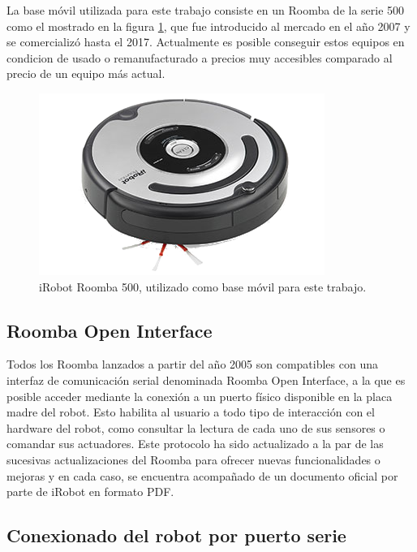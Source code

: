 La base móvil utilizada para este trabajo consiste en un Roomba de la serie 500 como el mostrado en la figura \ref{fig:roomba}, que fue introducido al mercado en el año 2007 y se comercializó hasta el 2017. Actualmente es posible conseguir estos equipos en condicion de usado o remanufacturado a precios muy accesibles comparado al precio de un equipo más actual.

\begin{figure}[ht]
    \centering
    \includegraphics[scale=2.5]{./Figures/roomba.png}
    \caption{iRobot Roomba 500, utilizado como base móvil para este trabajo.\protect\footnotemark}
    \label{fig:roomba}
\end{figure}


\subsection{Roomba Open Interface}\label{sec:openInterface}
Todos los Roomba lanzados a partir del año 2005 son compatibles con una interfaz de comunicación serial denominada Roomba Open Interface, a la que es posible acceder mediante la conexión a un puerto físico disponible en la placa madre del robot. Esto habilita al usuario a todo tipo de interacción con el hardware del robot, como consultar la lectura de cada uno de sus sensores o comandar sus actuadores. Este protocolo ha sido actualizado a la par de las sucesivas actualizaciones del Roomba para ofrecer nuevas funcionalidades o mejoras y en cada caso, se encuentra acompañado de un documento oficial por parte de iRobot en formato PDF\protect\footnotemark.



\subsection{Conexionado del robot por puerto serie}

